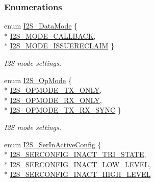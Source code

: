 \subsubsection*{Enumerations}
\begin{DoxyCompactItemize}
\item 
enum \hyperlink{_i2_s_8h_a120b8555bc048186bbd436dbdbb5b405}{I2\+S\+\_\+\+Data\+Mode} \{ \\*
\hyperlink{_i2_s_8h_a120b8555bc048186bbd436dbdbb5b405a2c7b409c7185250bef51c0e6de600d08}{I2\+S\+\_\+\+M\+O\+D\+E\+\_\+\+C\+A\+L\+L\+B\+A\+C\+K}, 
\\*
\hyperlink{_i2_s_8h_a120b8555bc048186bbd436dbdbb5b405a294b93c8f4917e45ac62b7c12b017f85}{I2\+S\+\_\+\+M\+O\+D\+E\+\_\+\+I\+S\+S\+U\+E\+R\+E\+C\+L\+A\+I\+M}
 \}
\begin{DoxyCompactList}\small\item\em I2\+S mode settings. \end{DoxyCompactList}\item 
enum \hyperlink{_i2_s_8h_a1eb065ff9040979c9d6586c8d0df9ee0}{I2\+S\+\_\+\+Op\+Mode} \{ \\*
\hyperlink{_i2_s_8h_a1eb065ff9040979c9d6586c8d0df9ee0a314552b49ae8d2f1d03c17e9dbf165d0}{I2\+S\+\_\+\+O\+P\+M\+O\+D\+E\+\_\+\+T\+X\+\_\+\+O\+N\+L\+Y}, 
\\*
\hyperlink{_i2_s_8h_a1eb065ff9040979c9d6586c8d0df9ee0a053d6506ed5a619c4ac829fe685091e0}{I2\+S\+\_\+\+O\+P\+M\+O\+D\+E\+\_\+\+R\+X\+\_\+\+O\+N\+L\+Y}, 
\\*
\hyperlink{_i2_s_8h_a1eb065ff9040979c9d6586c8d0df9ee0a0c2c408585299080663f8eb6cc289c04}{I2\+S\+\_\+\+O\+P\+M\+O\+D\+E\+\_\+\+T\+X\+\_\+\+R\+X\+\_\+\+S\+Y\+N\+C}
 \}
\begin{DoxyCompactList}\small\item\em I2\+S mode settings. \end{DoxyCompactList}\item 
enum \hyperlink{_i2_s_8h_a59a8a15850cffe145050ee9f0958bcd3}{I2\+S\+\_\+\+Ser\+In\+Active\+Config} \{ \\*
\hyperlink{_i2_s_8h_a59a8a15850cffe145050ee9f0958bcd3a66aeb3fe813ed8c66e3e9e145068cdbd}{I2\+S\+\_\+\+S\+E\+R\+C\+O\+N\+F\+I\+G\+\_\+\+I\+N\+A\+C\+T\+\_\+\+T\+R\+I\+\_\+\+S\+T\+A\+T\+E}, 
\\*
\hyperlink{_i2_s_8h_a59a8a15850cffe145050ee9f0958bcd3ab0f78819f591a0100ecef46f97e0c7d9}{I2\+S\+\_\+\+S\+E\+R\+C\+O\+N\+F\+I\+G\+\_\+\+I\+N\+A\+C\+T\+\_\+\+L\+O\+W\+\_\+\+L\+E\+V\+E\+L}, 
\\*
\hyperlink{_i2_s_8h_a59a8a15850cffe145050ee9f0958bcd3a5fd9b84daf2b878932e3a28a6c21ea57}{I2\+S\+\_\+\+S\+E\+R\+C\+O\+N\+F\+I\+G\+\_\+\+I\+N\+A\+C\+T\+\_\+\+H\+I\+G\+H\+\_\+\+L\+E\+V\+E\+L}

\end{DoxyCompactItemize}
